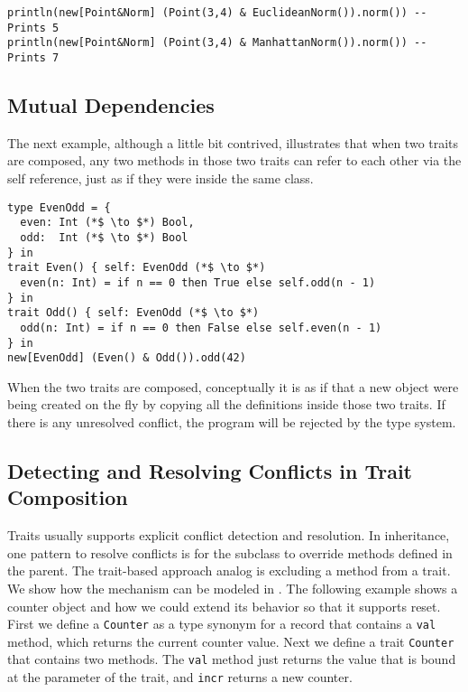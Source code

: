 \begin{lstlisting}
println(new[Point&Norm] (Point(3,4) & EuclideanNorm()).norm()) --Prints 5
println(new[Point&Norm] (Point(3,4) & ManhattanNorm()).norm()) --Prints 7
\end{lstlisting}

\subsection{Mutual Dependencies}

The next example, although a little bit contrived, illustrates that when two
traits are composed, any two methods in those two traits can refer to each
other via the self reference, just as if they were inside the same class.

\begin{lstlisting}
type EvenOdd = {
  even: Int (*$ \to $*) Bool,
  odd:  Int (*$ \to $*) Bool
} in
trait Even() { self: EvenOdd (*$ \to $*)
  even(n: Int) = if n == 0 then True else self.odd(n - 1)
} in
trait Odd() { self: EvenOdd (*$ \to $*)
  odd(n: Int) = if n == 0 then False else self.even(n - 1)
} in
new[EvenOdd] (Even() & Odd()).odd(42)
\end{lstlisting}

When the two traits are composed, conceptually it is as if that a new object were
being created on the fly by copying all the definitions inside those two traits.
If there is any unresolved conflict, the program will be rejected by the type
system.

\subsection{Detecting and Resolving Conflicts in Trait Composition}

Traits usually supports explicit conflict detection and resolution.
In inheritance, one pattern to resolve conflicts is for the subclass to override methods defined in the parent.
The trait-based approach analog is excluding a method from a trait.
We show how the mechanism can be modeled in \name.
The following example shows a counter object and how we could extend its
behavior so that it supports reset. First we define a \lstinline$Counter$ as a
type synonym for a record that contains a \lstinline$val$ method, which returns
the current counter value. Next we define a trait \lstinline$Counter$ that
contains two methods. The \lstinline$val$ method just returns the value that is
bound at the parameter of the trait, and \lstinline$incr$ returns a new counter.

